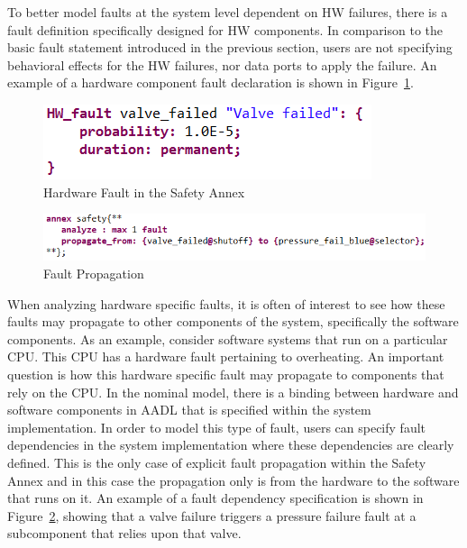 To better model faults at the system level dependent on HW failures, there is a fault definition specifically designed for HW components. In comparison to the basic fault statement introduced in the previous section, users are not specifying behavioral effects for the HW failures, nor data ports to apply the failure. An example of a hardware component fault declaration is shown in Figure~\ref{fig:hardware_fault}.

\begin{figure}[h!]
	\begin{center}
		\includegraphics[width=.4\textwidth]{images/hw_fault.png}
		\caption{Hardware Fault in the Safety Annex}
		\label{fig:hardware_fault}
	\end{center}
\end{figure}


\begin{figure}[]
	\begin{center}
		\includegraphics[width=.7\textwidth]{images/fault_propagation.png}
		\caption{Fault Propagation}
		\label{fig:fault_propagation}
	\end{center}
\end{figure}

When analyzing hardware specific faults, it is often of interest to see how these faults may propagate to other components of the system, specifically the software components. As an example, consider software systems that run on a particular CPU. This CPU has a hardware fault pertaining to overheating. An important question is how this hardware specific fault may propagate to components that rely on the CPU. In the nominal model, there is a binding between hardware and software components in AADL that is specified within the system implementation. In order to model this type of fault, users can specify fault dependencies in the system implementation where these dependencies are clearly defined. This is the only case of explicit fault propagation within the Safety Annex and in this case the propagation only is from the hardware to the software that runs on it. An example of a fault dependency specification is shown in Figure~\ref{fig:fault_propagation}, showing that a valve failure triggers a pressure failure fault at a subcomponent that relies upon that valve. 


